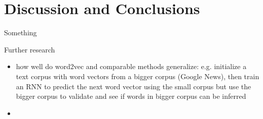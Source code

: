 \clearpage
\section{Discussion and Conclusions}

Something

Further research

\begin{itemize}
  \item how well do word2vec and comparable methods generalize: e.g. initialize a text corpus with word vectors from a bigger corpus (Google News), then train an RNN to predict the next word vector using the small corpus but use the bigger corpus to validate and see if words in bigger corpus can be inferred
  \item
\end{itemize}
